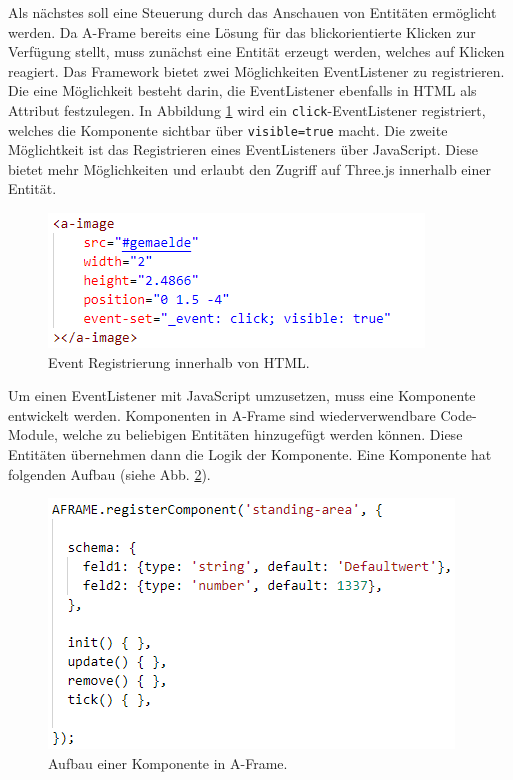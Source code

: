 \documentclass[a4paper,12pt,oneside]{article}
\begin{document}
        Als nächstes soll eine Steuerung durch das Anschauen von Entitäten
        ermöglicht werden. Da A-Frame bereits eine Lösung für das 
        blickorientierte Klicken zur Verfügung stellt, muss zunächst eine
        Entität erzeugt werden, welches auf Klicken reagiert. Das Framework
        bietet zwei Möglichkeiten EventListener zu registrieren. Die eine
        Möglichkeit besteht darin, die EventListener ebenfalls in HTML
        als Attribut festzulegen. In Abbildung \ref{fig:a-image2} wird
        ein \texttt{click}-EventListener registriert, welches die Komponente 
        sichtbar über \texttt{visible=true} macht. Die zweite Möglichtkeit
        ist das Registrieren eines EventListeners über JavaScript. Diese
        bietet mehr Möglichkeiten und erlaubt den Zugriff auf Three.js
        innerhalb einer Entität.
        \begin{figure}[h]
          \centering
          \includegraphics{img/coding/a-image2.png}
          \caption{Event Registrierung innerhalb von HTML.}
          \label{fig:a-image2}
        \end{figure}
        Um einen EventListener mit JavaScript umzusetzen, muss eine Komponente
        entwickelt werden. Komponenten in A-Frame sind wiederverwendbare
        Code-Module, welche zu beliebigen Entitäten hinzugefügt werden
        können. Diese Entitäten übernehmen dann die Logik der Komponente.
        Eine Komponente hat folgenden Aufbau (siehe Abb. \ref{fig:komponente1}).
        \begin{figure}[h]
          \centering
          \includegraphics{img/coding/komponente1.png}
          \caption{Aufbau einer Komponente in A-Frame.}
          \label{fig:komponente1}
        \end{figure}
\end{document}
